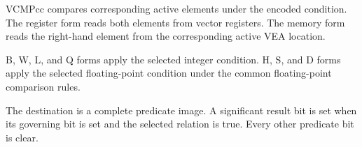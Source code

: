 VCMPcc compares corresponding active elements under the encoded condition.
The register form reads both elements from vector registers. The memory form
reads the right-hand element from the corresponding active VEA location.

B, W, L, and Q forms apply the selected integer condition.
H, S, and D forms apply the selected floating-point condition under the common
floating-point comparison rules.

The destination is a complete predicate image. A significant result bit is
set when its governing bit is set and the selected relation is true. Every
other predicate bit is clear.
